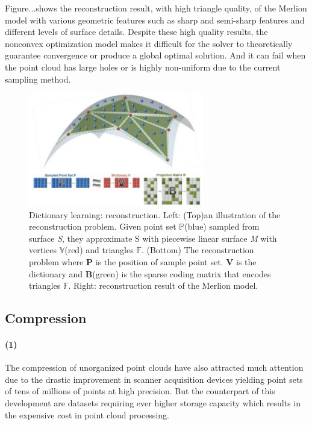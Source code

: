 Figure...shows the reconstruction result, with high triangle quality, of the Merlion model with various geometric features such as sharp and semi-sharp features and different levels of surface details. Despite these high quality results, the nonconvex optimization model makes it difficult for the solver to theoretically guarantee convergence or produce a global optimal solution. And it can fail when the point cloud has large holes or is highly non-uniform due to the current sampling method.

\begin{figure}[ht]
  \centering
  \includegraphics[width=3in]{images/reconstruction_learning}
  \caption{Dictionary learning: reconstruction\cite{}. Left: (Top)an illustration of the reconstruction problem. Given point set $\mathbb{P}$(blue) sampled from surface \textsl{S}, they approximate S with piecewise linear surface \textsl{M} with vertices $\mathbb{V}$(red) and triangles $\mathbb{F}$. (Bottom) The reconstruction problem where $\mathbf{P}$ is the position of sample point set. $\mathbf{V}$ is the dictionary and $\mathbf{B}$(green) is the sparse coding matrix that encodes triangles $\mathbb{F}$. Right: reconstruction result of the Merlion model.}
\end{figure}


\subsection{Compression}

\paragraph{(1)}The compression of unorganized point clouds have also attracted much attention due to the drastic improvement in scanner acquisition devices yielding point sets of tens of millions of points at high precision. But the counterpart of this development are datasets requiring ever higher storage capacity which results in the expensive cost in point cloud processing.


